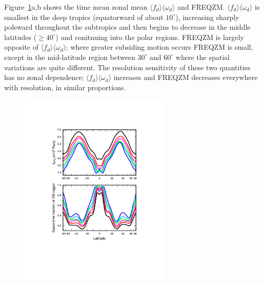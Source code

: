 Figure~\ref{fig:vomg}a,b shows the time mean zonal mean $\langle f_{d} \rangle \langle \omega_{d} \rangle$ and FREQZM. $\langle f_{d} \rangle \langle \omega_{d} \rangle$ is smallest in the deep tropics (equatorward of about $10^{\circ}$), increasing sharply poleward throughout the subtropics and then begins to decrease in the middle latitudes ($\geq 40^{\circ}$) and conitnuing into the polar regions. FREQZM is largely opposite of $\langle f_{d} \rangle \langle \omega_{d} \rangle$; where greater subsiding motion occurs FREQZM is small, except in the mid-latitude region between $30^{\circ}$ and $60^{\circ}$ where the spatial variations are quite different. The resolution sensitivity of these two quantities has no zonal dependence; $\langle f_{d} \rangle \langle \omega_{d} \rangle$ increases and FREQZM decreases everywhere with resolution, in similar proportions.

\begin{figure}[t]
\begin{center}
\noindent\includegraphics[width=17pc,angle=0]{chapter6/temp_zonal_fracd*vomgd.pdf}\\
\end{center}
\caption{}
\label{fig:vomg}
\end{figure}

